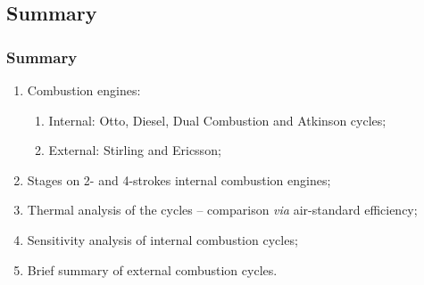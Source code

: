 \documentclass[10pt,compress]{beamer}
\begin{document}
\subsection{Summary}
\begin{frame}
 \frametitle{Summary}
 \begin{enumerate}
  \item <1-> Combustion engines:
  \begin{enumerate}
    \item <2-> Internal: Otto, Diesel, Dual Combustion and Atkinson cycles;
    \item <3-> External: Stirling and Ericsson;
  \end{enumerate}
  \item <4-> Stages on 2- and 4-strokes internal combustion engines;
  \item <5-> Thermal analysis of the cycles -- comparison {\it via} air-standard efficiency;
  \item <6-> Sensitivity analysis of internal combustion cycles;
  \item <7-> Brief summary of external combustion cycles.
 \end{enumerate}
\end{frame}
\end{document}
